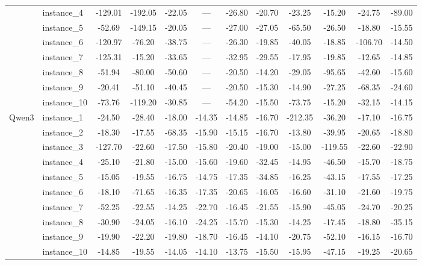 \documentclass[sigconf]{acmart}
\begin{document}
\begin{table}[htbp]
\begin{tabular}{ll cccc ccc ccc}
 & instance\_4 & -129.01 & -192.05 & -22.05 & --- & -26.80 & -20.70 & -23.25 & -15.20 & -24.75 & -89.00 \\
 & instance\_5 & -52.69 & -149.15 & -20.05 & --- & -27.00 & -27.05 & -65.50 & -26.50 & -18.80 & -15.55 \\
 & instance\_6 & -120.97 & -76.20 & -38.75 & --- & -26.30 & -19.85 & -40.05 & -18.85 & -106.70 & -14.50 \\
 & instance\_7 & -125.31 & -15.20 & -33.65 & --- & -32.95 & -29.55 & -17.95 & -19.85 & -12.65 & -14.85 \\
 & instance\_8 & -51.94 & -80.00 & -50.60 & --- & -20.50 & -14.20 & -29.05 & -95.65 & -42.60 & -15.60 \\
 & instance\_9 & -20.41 & -51.10 & -40.45 & --- & -20.50 & -15.30 & -14.90 & -27.25 & -68.35 & -24.60 \\
 & instance\_10 & -73.76 & -119.20 & -30.85 & --- & -54.20 & -15.50 & -73.75 & -15.20 & -32.15 & -14.15 \\
\midrule
Qwen3 & instance\_1 & -24.50 & -28.40 & -18.00 & -14.35 & -14.85 & -16.70 & -212.35 & -36.20 & -17.10 & -16.75 \\
 & instance\_2 & -18.30 & -17.55 & -68.35 & -15.90 & -15.15 & -16.70 & -13.80 & -39.95 & -20.65 & -18.80 \\
 & instance\_3 & -127.70 & -22.60 & -17.50 & -15.80 & -20.40 & -19.00 & -15.00 & -119.55 & -22.60 & -22.90 \\
 & instance\_4 & -25.10 & -21.80 & -15.00 & -15.60 & -19.60 & -32.45 & -14.95 & -46.50 & -15.70 & -18.75 \\
 & instance\_5 & -15.05 & -19.55 & -16.75 & -14.75 & -17.35 & -34.85 & -16.25 & -43.15 & -17.55 & -17.25 \\
 & instance\_6 & -18.10 & -71.65 & -16.35 & -17.35 & -20.65 & -16.05 & -16.60 & -31.10 & -21.60 & -19.75 \\
 & instance\_7 & -52.25 & -22.55 & -14.25 & -22.70 & -16.45 & -21.55 & -15.90 & -45.05 & -24.70 & -20.25 \\
 & instance\_8 & -30.90 & -24.05 & -16.10 & -24.25 & -15.70 & -15.30 & -14.25 & -17.45 & -18.80 & -35.15 \\
 & instance\_9 & -19.90 & -22.20 & -19.80 & -18.70 & -16.45 & -14.10 & -20.75 & -52.10 & -16.15 & -16.70 \\
 & instance\_10 & -14.85 & -19.55 & -14.05 & -14.10 & -13.75 & -15.50 & -15.95 & -47.15 & -19.25 & -20.65 \\
\bottomrule
\end{tabular}
\end{table}
\end{document}
